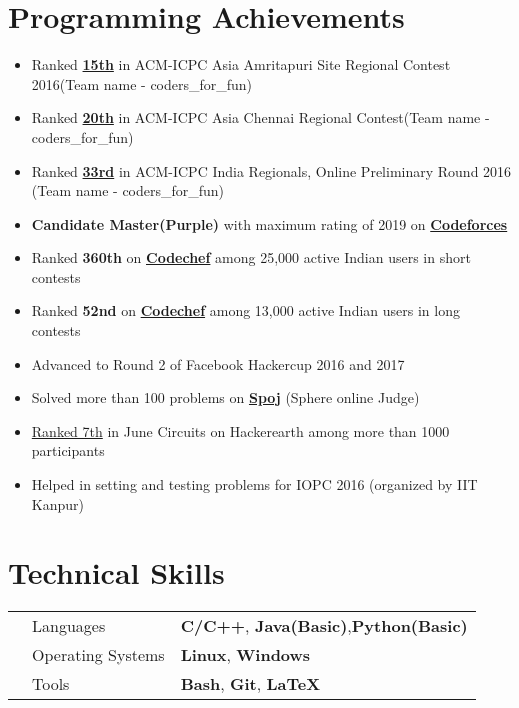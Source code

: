 \documentclass[11pt,a4paper]{article}
\begin{document}
\section*{Programming Achievements}
\begin{itemize}
\item Ranked \href{http://amrita2016.cloudcontest.org/public/}{\textbf{15th}} in ACM-ICPC Asia Amritapuri Site Regional Contest 2016(Team name - coders\_for\_fun)
\item Ranked \href{https://icpc.baylor.edu/regionals/finder/ar-chennai-2016/standings} {\textbf{20th}} in ACM-ICPC Asia Chennai Regional Contest(Team name - coders\_for\_fun) 
\item Ranked \href{https://www.codechef.com/rankings/ACMIND16?order=asc&page=2&sortBy=rank} {\textbf{33rd}} in ACM-ICPC India Regionals, Online Preliminary Round 2016 (Team name - coders\_for\_fun)
\item \textbf{Candidate Master(Purple)} with maximum rating of 2019 on  \href{http://codeforces.com/profile/Swastik1996} {\textbf{Codeforces}}
\item Ranked \textbf{360th} on \href{http://codechef.com/users/Swastik1996} {\textbf{Codechef}} among 25,000 active Indian users in short contests
\item Ranked \textbf{52nd} on \href{http://codechef.com/users/Swastik1996} {\textbf{Codechef}} among 13,000 active Indian users in long contests
\item Advanced to Round 2 of Facebook Hackercup 2016 and 2017
\item Solved more than 100 problems on \href{http://www.spoj.com/users/swastik1996/} {\textbf{Spoj}} (Sphere online Judge)
\item \href{https://www.hackerearth.com/june-circuits/leaderboard/} {Ranked 7th} in June Circuits on Hackerearth among more than 1000 participants 
\item Helped in setting and testing problems for IOPC 2016 (organized by IIT Kanpur)
\end{itemize}

\section*{Technical Skills}
\vspace{-0.2cm}
\begin{tabular}{L{0.05cm} L{5cm} l}
&Languages     &\textbf{C/C++}, \textbf{Java(Basic)},\textbf{Python(Basic)}\\
&Operating Systems     &\textbf{Linux}, \textbf{Windows}\\
&Tools &\textbf{Bash}, \textbf{Git}, \textbf{\LaTeX}\\
\end{tabular}
\vspace{-0.4cm}
\end{document}
